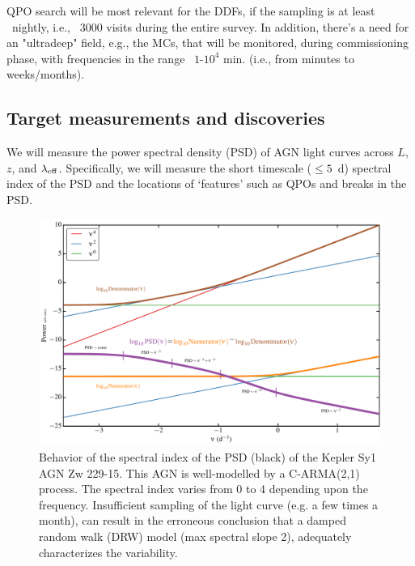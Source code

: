 QPO search will be most relevant for the DDFs, if the sampling is at least ~nightly, i.e., ~3000 visits
during the entire survey. In addition, there's a need for an "ultradeep" field, e.g., the MCs, that will
be monitored, during commissioning phase, with frequencies in the range ~$1$-$10^4$ min. (i.e., from
minutes to weeks/months).


\subsection{Target measurements and discoveries}
\label{sec:\secname:targets}

We will measure the power spectral density (PSD) of AGN light 
curves across $L$, $z$, and $\lambda_{\rm eff}$. Specifically, we will
 measure the short timescale ($\leq 5$~d) spectral index of the PSD and
 the locations of `features' such as QPOs
 and breaks in the PSD.

\begin{figure}
\includegraphics[width=5.0in]{figs/agn/AGN_Variability_01.pdf}
\caption{Behavior of the spectral index of the PSD (black) of the Kepler Sy1 
AGN Zw 229-15. This AGN is well-modelled by a C-ARMA(2,1) process. The spectral index varies
from 0 to 4 depending upon the frequency. Insufficient sampling of the light
curve (e.g. a few times a month), can result in the erroneous conclusion that a 
damped random walk (DRW) model (max spectral slope 2), adequately 
characterizes the variability.
}
\label{PSDvsFreq}
\end{figure}

